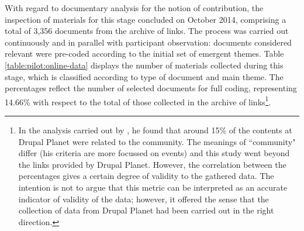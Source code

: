 With regard to documentary analysis for the notion of contribution, the inspection of materials for this stage concluded on  October 2014, comprising a total of 3,356 documents from the archive of links. The process was carried out continuously and in parallel with participant observation: documents considered relevant were pre-coded according to the initial set of emergent themes. Table \ref{table:pilot:online-data} displays the number of materials collected during this stage, which is classified according to type of document and main theme. The percentages reflect the number of selected documents for full coding, representing 14.66\% with respect to the total of those collected in the archive of links\footnote{\label{fn:da-validity} In the analysis carried out by \textcite{drupal-planet-stats:2014:Online}, he found that around 15\% of the contents at Drupal Planet were related to the community. The meanings of ``community" differ (his criteria are more focussed on events) and this study went beyond the links provided by Drupal Planet. However, the correlation between the percentages gives a certain degree of validity to the gathered data. The intention is not to argue that this metric can be interpreted as an accurate indicator of validity of the data; however, it offered the sense that the collection of data from Drupal Planet had been carried out in the right direction.}.


